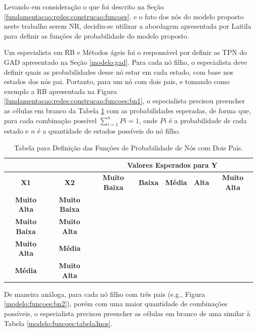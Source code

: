 Levando em consideração o que foi descrito na Seção \ref{fundamentacao:redes:construcao:funcoes}, e o fato dos nós do modelo proposto neste trabalho serem NR, decidiu-se utilizar a abordagem apresentada por Laitila \cite{laitila} para definir as funções de probabilidade do modelo proposto.

Um especialista em RB e Métodos ágeis foi o responsável por definir as TPN do GAD apresentado na Seção \ref{modelo:gad}. Para cada nó filho, o especialista deve definir quais as probabilidades desse nó estar em cada estado, com base nos estados dos nós pai. Portanto, para um nó com dois pais, e tomando como exemplo a RB apresentada na Figura \ref{fundamentacao:redes:construcao:funcoes:bn1}, o especialista precisou preencher as células em branco da Tabela \ref{modelo:funcoes:tabela2nos} com as probabilidades esperadas, de forma que, para cada combinação possível $\sum_{i=1}^{n}Pi = 1$, onde $Pi$ é a probabilidade de cada estado e $n$ é a quantidade de estados possíveis do nó filho.

\begin{table}[ht!]
\centering
\caption{Tabela para Definição das Funções de Probabilidade de Nós com Dois Pais.}
\label{modelo:funcoes:tabela2nos}
\begin{tabular}{|c|c|c|c|c|c|c|}
\hline
\multicolumn{2}{|l|}{}                      & \multicolumn{5}{c|}{\textbf{Valores Esperados para Y}}                                       \\ \hline
\textbf{X1}          & \textbf{X2}          & \textbf{Muito Baixa} & \textbf{Baixa} & \textbf{Média} & \textbf{Alta} & \textbf{Muito Alta} \\ \hline
\textbf{Muito Alta}  & \textbf{Muito Baixa} &               &         &         &        &               \\ \hline
\textbf{Muito Baixa} & \textbf{Muito Alta}  &               &         &         &        &              \\ \hline
\textbf{Muito Alta}  & \textbf{Média}       &               &         &         &        &              \\ \hline
\textbf{Média}       & \textbf{Muito Alta}  &               &         &         &        &              \\ \hline
\end{tabular}
\end{table}

De maneira análoga, para cada nó filho com três pais (e.g., Figura \ref{modelo:funcoes:bn2}), porém com uma maior quantidade de combinações possíveis, o especialista precisou preencher as células em branco de uma similar à Tabela \ref{modelo:funcoes:tabela3nos}.

